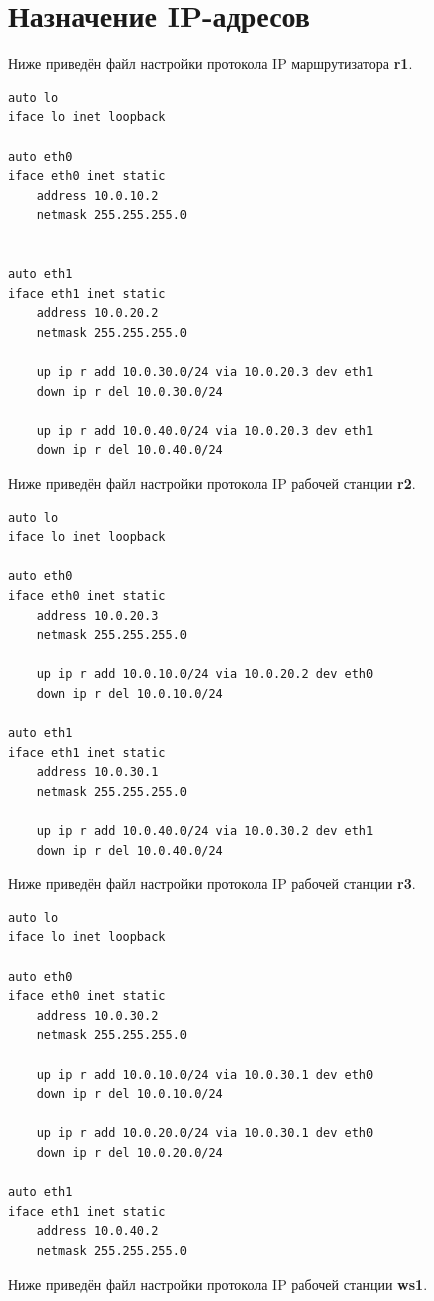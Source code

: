\documentclass[a4paper,12pt]{article}
\begin{document}
\section{Назначение IP-адресов}

Ниже приведён файл настройки протокола IP маршрутизатора \textbf{r1}.

\begin{Verbatim}
auto lo
iface lo inet loopback

auto eth0
iface eth0 inet static
	address 10.0.10.2
	netmask 255.255.255.0
	

auto eth1
iface eth1 inet static
	address 10.0.20.2
	netmask 255.255.255.0
	
	up ip r add 10.0.30.0/24 via 10.0.20.3 dev eth1
	down ip r del 10.0.30.0/24
	
	up ip r add 10.0.40.0/24 via 10.0.20.3 dev eth1
	down ip r del 10.0.40.0/24
\end{Verbatim}

Ниже приведён файл настройки протокола IP рабочей станции \textbf{r2}.

\begin{Verbatim}
auto lo
iface lo inet loopback

auto eth0
iface eth0 inet static
	address 10.0.20.3
	netmask 255.255.255.0
	
	up ip r add 10.0.10.0/24 via 10.0.20.2 dev eth0
	down ip r del 10.0.10.0/24

auto eth1
iface eth1 inet static
	address 10.0.30.1
	netmask 255.255.255.0
	
	up ip r add 10.0.40.0/24 via 10.0.30.2 dev eth1
	down ip r del 10.0.40.0/24
\end{Verbatim}

Ниже приведён файл настройки протокола IP рабочей станции \textbf{r3}.

\begin{Verbatim}
auto lo
iface lo inet loopback

auto eth0
iface eth0 inet static
	address 10.0.30.2
	netmask 255.255.255.0
	
	up ip r add 10.0.10.0/24 via 10.0.30.1 dev eth0
	down ip r del 10.0.10.0/24
	
	up ip r add 10.0.20.0/24 via 10.0.30.1 dev eth0
	down ip r del 10.0.20.0/24

auto eth1
iface eth1 inet static
	address 10.0.40.2
	netmask 255.255.255.0
\end{Verbatim}

Ниже приведён файл настройки протокола IP рабочей станции \textbf{ws1}.
\end{document}
